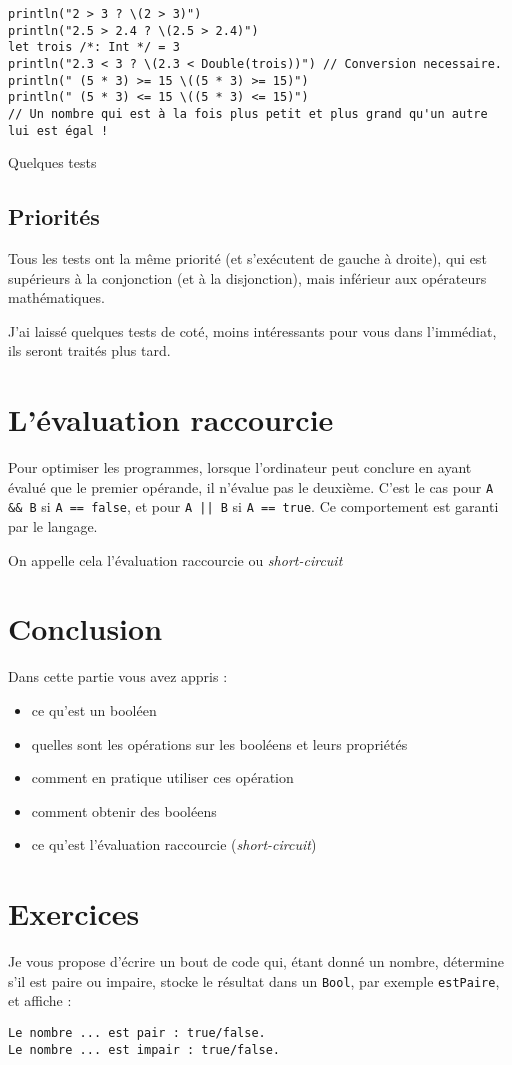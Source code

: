 \begin{listing}[h]
\begin{verbatim}
println("2 > 3 ? \(2 > 3)")
println("2.5 > 2.4 ? \(2.5 > 2.4)")
let trois /*: Int */ = 3
println("2.3 < 3 ? \(2.3 < Double(trois))") // Conversion necessaire.
println(" (5 * 3) >= 15 \((5 * 3) >= 15)")
println(" (5 * 3) <= 15 \((5 * 3) <= 15)")
// Un nombre qui est à la fois plus petit et plus grand qu'un autre lui est égal !

\end{verbatim}
\caption{Quelques tests}
\end{listing}%
\subsection{Priorités}
Tous les tests ont la même priorité
(et s'exécutent de gauche à droite),
qui est supérieurs à la conjonction (et à la disjonction),
mais inférieur aux opérateurs mathématiques.



J'ai laissé quelques tests de coté, moins intéressants pour vous dans l'immédiat, ils seront traités plus tard.
\section{L'évaluation raccourcie}
Pour optimiser les programmes, lorsque l'ordinateur peut conclure en ayant évalué que le premier opérande, il n'évalue pas le deuxième. C'est le cas pour \texttt{A && B} si \texttt{A == false},
et pour \texttt{A || B} si \texttt{A == true}.
Ce comportement est garanti par le langage.

On appelle cela l'évaluation raccourcie ou \emph{short-circuit}


\section*{Conclusion}
{}
Dans cette partie vous avez appris :
\begin{itemize}
\item ce qu'est un booléen
\item quelles sont les opérations sur les booléens et leurs propriétés
\item comment en pratique utiliser ces opération
\item comment obtenir des booléens
\item ce qu'est l'évaluation raccourcie (\emph{short-circuit})
\end{itemize}
\section*{Exercices}
{}
Je vous propose d'écrire un bout de code qui, étant donné un nombre,
détermine s'il est paire ou impaire, stocke le résultat dans un \texttt{Bool}, par exemple \texttt{estPaire}, et affiche :
\begin{verbatim}
Le nombre ... est pair : true/false.
Le nombre ... est impair : true/false.
\end{verbatim}